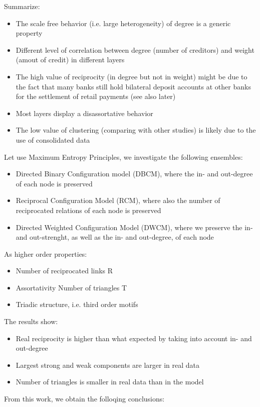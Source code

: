 Summarize:
\begin{itemize}
	\item The scale free behavior (i.e. large heterogeneity) of degree is a generic property 
	\item Different level of correlation between degree (number of creditors) and weight (amout of credit) in different layers
	\item The high value of reciprocity (in degree but not in weight) might be due to the fact that many banks still hold bilateral deposit accounts at other banks for the settlement of retail payments (see also later)
	\item Most layers display a disassortative behavior 
	\item The low value of clustering (comparing with other studies) is likely due to the use of
	consolidated data
\end{itemize}
Let use Maximum Entropy Principles, we investigate the following ensembles:
\begin{itemize}
	\item Directed Binary Configuration model (DBCM), where the in- and out-degree of each node is preserved \item Reciprocal Configuration Model (RCM), where also the number of reciprocated relations of each node is preserved 
	\item Directed Weighted Configuration Model (DWCM), where we preserve the in- and
	out-strenght, as well as the in- and out-degree, of each node
\end{itemize}
As higher order properties:
\begin{itemize}
	\item Number of reciprocated links R 
	\item Assortativity Number of triangles T
	\item Triadic structure, i.e. third order motifs
\end{itemize}
The results show:
\begin{itemize}
	\item Real reciprocity is higher than what expected by taking into account in- and out-degree 
	\item Largest strong and weak components are larger in real data
	\item Number of triangles is smaller in real data than in the model
\end{itemize}
From this work, we obtain the folloqing conclusions:
